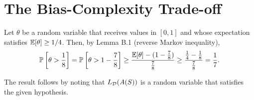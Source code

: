 \chapter{The Bias-Complexity Trade-off}

\begin{ex}
  Let $\theta$ be a random variable that receives values in $[0, 1]$ and whose
  expectation satisfies $\mathbb{E}[\theta] \geq 1/4$. Then, by Lemma B.1
  (reverse Markov inequality),
  \begin{align*}
    \mathbb{P}\left[\theta > \frac{1}{8}\right]
    = \mathbb{P}\left[\theta > 1-\frac{7}{8}\right]
    \geq \frac{\mathbb{E}[\theta]-(1-\frac{7}{8})}{\frac{7}{8}}
    \geq \frac{\frac{1}{4}-\frac{1}{8}}{\frac{7}{8}}
    =\frac{1}{7}.
  \end{align*}

  The result follows by noting that $L_{\mathcal{D}}(A(S))$ is a random variable that
  satisfies the given hypothesis.
\end{ex}

\begin{ex}
\end{ex}

\begin{ex}
\end{ex}